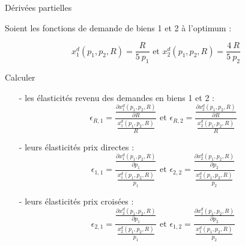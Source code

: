 \documentclass[9pt,handout,professionalfonts,hyperref]{beamer}
\begin{document}
\begin{frame}{Dérivées partielles}

Soient les fonctions de demande de biens 1 et 2 à l'optimum :

$$x_1^d(p_1,p_2,R) = \frac{R}{5~p_1} \text{ et } x_2^d(p_1,p_2,R) = \frac{4~R}{5~p_2}$$

Calculer

\begin{itemize}
	\item[-] les élasticités revenu des demandes en biens 1 et 2 : $$\epsilon_{R,1}
	= \frac{\frac{\partial x_1^d(p_1,p_2,R)}{\partial R}}{\frac{x_1^d(p_1,p_2,R) }{R}}\text{ et } \epsilon_{R,2}
	= \frac{\frac{\partial x_2^d(p_1,p_2,R)}{\partial R}}{\frac{x_2^d(p_1,p_2,R) }{R}}$$
	\item[-] leurs élasticités prix directes : $$\epsilon_{1,1}
	= \frac{\frac{\partial x_1^d(p_1,p_2,R)}{\partial p_1}}{\frac{x_1^d(p_1,p_2,R) }{p_1}}\text{ et } \epsilon_{2,2}
	= \frac{\frac{\partial x_2^d(p_1,p_2,R)}{\partial p_2}}{\frac{x_2^d(p_1,p_2,R) }{p_2}}$$
	\item[-] leurs élasticités prix croisées : $$\epsilon_{2,1}
	= \frac{\frac{\partial x_2^d(p_1,p_2,R)}{\partial p_1}}{\frac{x_2^d(p_1,p_2,R) }{p_1}}\text{ et }\epsilon_{1,2}
	= \frac{\frac{\partial x_1^d(p_1,p_2,R)}{\partial p_2}}{\frac{x_1^d(p_1,p_2,R) }{p_2}}$$
\end{itemize}

\end{frame}
\end{document}
